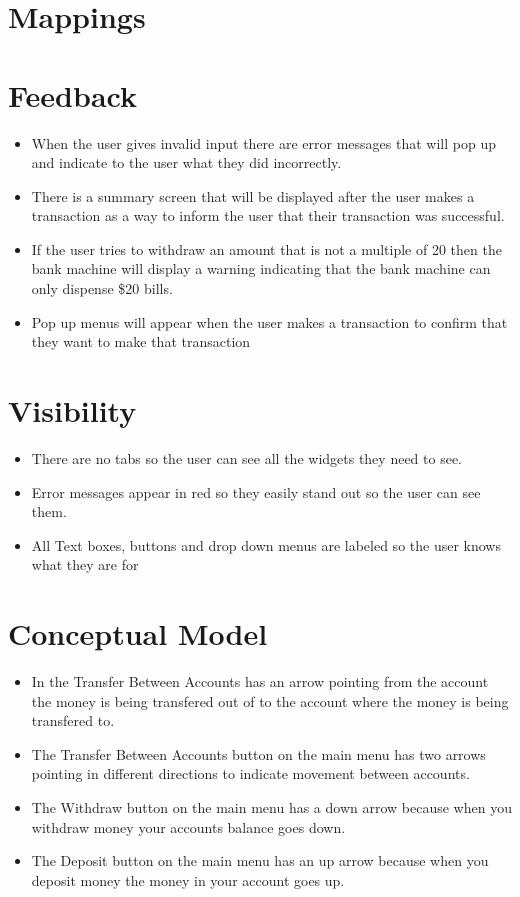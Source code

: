 \documentclass[10pt]{article}
\begin{document}
\section{Mappings} %

\section{Feedback} %
\begin{itemize}
\item When the user gives invalid input there are error messages that will pop up and indicate to the user what they did incorrectly.
\item There is a summary screen that will be displayed after the user makes a transaction as a way to inform the user that their transaction was successful.
\item If the user tries to withdraw an amount that is not a multiple of 20 then the bank machine will display a warning indicating that the bank machine can only dispense \$20 bills.
\item Pop up menus will appear when the user makes a transaction to confirm that they want to make that transaction
\end{itemize}

\section{Visibility} %
\begin{itemize}
\item There are no tabs so the user can see all the widgets they need to see.
\item Error messages appear in red so they easily stand out so the user can see them.
\item All Text boxes, buttons and drop down menus are labeled so the user knows what they are for
\end{itemize}

\section{Conceptual Model} %
\begin{itemize}
\item In the Transfer Between Accounts has an arrow pointing from the account the money is being transfered out of to the account where the money is being transfered to.
\item The Transfer Between Accounts button on the main menu has two arrows pointing in different directions to indicate movement between accounts.
\item The Withdraw button on the main menu has a down arrow because when you withdraw money your accounts balance goes down.
\item The Deposit button on the main menu has an up arrow because when you deposit money the money in your account goes up.
\end{itemize}
\end{document}
